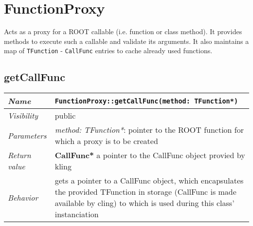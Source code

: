 \chapter{FunctionProxy}
	Acts as a proxy for a ROOT callable (i.e. function or class method). It provides methods to execute such a callable and validate its arguments. It also maintains a map of \texttt{TFunction} - \texttt{CallFunc} entries to cache already used functions.

\section{getCallFunc}
\begin{longtable}{p{3cm} @{\hskip 1cm} p{12cm}}
	\hline

	\textit{Name} & \texttt{FunctionProxy::getCallFunc(method: TFunction*)}\\
	\hline

	\textit{Visibility} & public\\
	\hline

	\textit{Parameters} &  \textit{method: TFunction*}: pointer to the ROOT function for which a proxy 
							is to be created\\
	\hline

	\textit{Return value} & \textbf{CallFunc*} a pointer to the CallFunc object provied by kling\\
	\hline

	\textit{Behavior} & gets a pointer to a CallFunc object, which encapsulates the provided TFunction 
			in storage (CallFunc is made available by cling)  to which is used during this class' instanciation\\
	\hline

\end{longtable} \pagebreak

